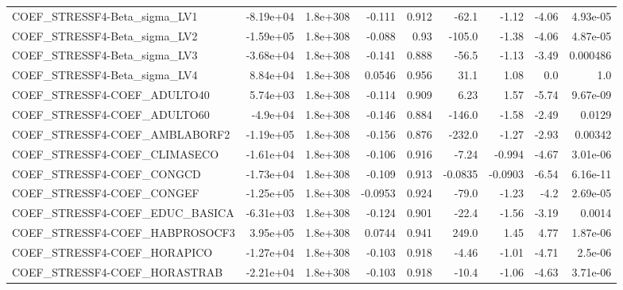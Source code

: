 \begin{tabular}{lrrrrrrrr}
COEF\_STRESSF4-Beta\_sigma\_LV1      &   -8.19e+04 &     1.8e+308 &  -0.111 &    0.912 &      -62.1 &       -1.12 &        -4.06 &      4.93e-05 \\
COEF\_STRESSF4-Beta\_sigma\_LV2      &   -1.59e+05 &     1.8e+308 &  -0.088 &     0.93 &     -105.0 &       -1.38 &        -4.06 &      4.87e-05 \\
COEF\_STRESSF4-Beta\_sigma\_LV3      &   -3.68e+04 &     1.8e+308 &  -0.141 &    0.888 &      -56.5 &       -1.13 &        -3.49 &      0.000486 \\
COEF\_STRESSF4-Beta\_sigma\_LV4      &    8.84e+04 &     1.8e+308 &  0.0546 &    0.956 &       31.1 &        1.08 &          0.0 &           1.0 \\
COEF\_STRESSF4-COEF\_ADULTO40       &    5.74e+03 &     1.8e+308 &  -0.114 &    0.909 &       6.23 &        1.57 &        -5.74 &      9.67e-09 \\
COEF\_STRESSF4-COEF\_ADULTO60       &    -4.9e+04 &     1.8e+308 &  -0.146 &    0.884 &     -146.0 &       -1.58 &        -2.49 &        0.0129 \\
COEF\_STRESSF4-COEF\_AMBLABORF2     &   -1.19e+05 &     1.8e+308 &  -0.156 &    0.876 &     -232.0 &       -1.27 &        -2.93 &       0.00342 \\
COEF\_STRESSF4-COEF\_CLIMASECO      &   -1.61e+04 &     1.8e+308 &  -0.106 &    0.916 &      -7.24 &      -0.994 &        -4.67 &      3.01e-06 \\
COEF\_STRESSF4-COEF\_CONGCD         &   -1.73e+04 &     1.8e+308 &  -0.109 &    0.913 &    -0.0835 &     -0.0903 &        -6.54 &      6.16e-11 \\
COEF\_STRESSF4-COEF\_CONGEF         &   -1.25e+05 &     1.8e+308 & -0.0953 &    0.924 &      -79.0 &       -1.23 &         -4.2 &      2.69e-05 \\
COEF\_STRESSF4-COEF\_EDUC\_BASICA    &   -6.31e+03 &     1.8e+308 &  -0.124 &    0.901 &      -22.4 &       -1.56 &        -3.19 &        0.0014 \\
COEF\_STRESSF4-COEF\_HABPROSOCF3    &    3.95e+05 &     1.8e+308 &  0.0744 &    0.941 &      249.0 &        1.45 &         4.77 &      1.87e-06 \\
COEF\_STRESSF4-COEF\_HORAPICO       &   -1.27e+04 &     1.8e+308 &  -0.103 &    0.918 &      -4.46 &       -1.01 &        -4.71 &       2.5e-06 \\
COEF\_STRESSF4-COEF\_HORASTRAB      &   -2.21e+04 &     1.8e+308 &  -0.103 &    0.918 &      -10.4 &       -1.06 &        -4.63 &      3.71e-06 \\

\end{tabular}

